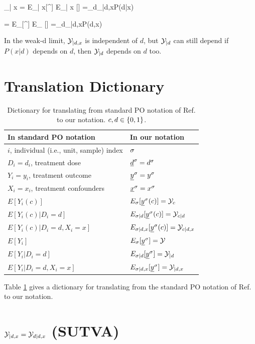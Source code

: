 \beq
\caly_{| x}
=
E_{\s| x}[\rvy^\s]
\rarrow
E_{\rvy| x} [\rvy]
=\sum_d\caly_{|d,x}P(d|x)
\eeq

\beq
\caly
=
E_{\s}[\rvy^\s]
\rarrow
E_{\rvy} [\rvy]
=\sum_d\caly_{|d,x}P(d,x)
\eeq


In the weak-d limit,
${\cal Y}_{|d,x}$ is independent
of $d$, but
${\cal Y}_{|d}$ can still depend
if $P(x|d)$ depends on $d$,
then
 ${\cal Y}_{|d}$ depends on $d$ too.




\section{Translation Dictionary}

{\renewcommand{\arraystretch}{1.5}
\begin{table}[h!]
\centering
\begin{tabular}{|l|l|}
\hline
\rowcolor[HTML]{ECF4FF} 
In standard PO notation&
In our notation \\
\hline
$i$, individual (i.e., unit, sample) index& $\sigma$ \\ 
\hline 
$D_i=d_i$, treatment dose & ${\underline{d}}^\sigma=d^\sigma$\\
\hline 
$Y_i=y_i$, treatment outcome& ${\underline{y}}^\sigma=y^\sigma$ \\ 
\hline 
$X_i=x_i$, treatment confounders& ${\underline{x}}^\sigma=x^\sigma$ \\ 
\hline
$E[Y_i(c)]$ & 
$E_{\sigma}[{\underline{y}}^\sigma(c)]={\cal Y}_{c}$ \\
\hline
$E[Y_i(c)|D_i= d]$ & 
$E_{\sigma| d}[{\underline{y}}^\sigma(c)]={\cal Y}_{c| d}$\\
\hline
$E[Y_i(c)|D_i= d, X_i=x]$ & 
$E_{\sigma| d,x}[{\underline{y}}^\sigma(c)]={\cal Y}_{c| d,x}$\\
\hline
$E[Y_i]$ & 
$E_{\sigma}[{\underline{y}}^\sigma]={\cal Y}$ \\
\hline
$E[Y_i|D_i= d]$ & 
$E_{\sigma| d}[{\underline{y}}^\sigma]={\cal Y}_{| d}$\\
\hline
$E[Y_i|D_i= d, X_i=x]$ & 
$E_{\sigma| d,x}[{\underline{y}}^\sigma]={\cal Y}_{| d,x}$\\
\hline
\end{tabular}
\caption{Dictionary for 
translating
from standard PO notation
of Ref.\cite{book-mixtape} 
to our notation. $c, d\in \{0,1\}$.
}
\label{tab-pot-out-dict}
\end{table}
}

Table \ref{tab-pot-out-dict}
gives a dictionary for 
translating
from the standard PO notation 
of Ref.\cite{book-mixtape}
to our notation. 


\section{${\cal Y}_{|d,x}
={\cal Y}_{d|d,x}$ (SUTVA)}



